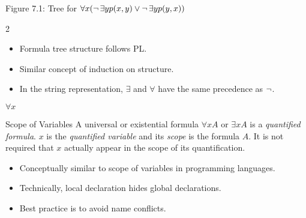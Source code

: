 \documentclass[style=sailor,size=12pt,mode=present]{powerdot}
\theoremstyle{definition}
\newenvironment{defn}[1]
  {\renewcommand\theinnerdefn{#1}\innerdefn}
  {\endinnerdefn}
\begin{document}
\begin{wideslide}[bm=,toc=]{Figure 7.1: Tree for
$\forall x(\mathop{\neg}\exists yp(x,y)\vee\mathop{\neg}\exists yp(y,x))$}
\begin{multicols}{2}
\begin{itemize}
\item Formula tree structure follows PL.
\item Similar concept of induction on structure.
\item In the string representation, $\exists$ and $\forall$ have the same precedence as $\mathop{\neg}$.
\end{itemize}
\begin{center}
\setlength{\GapWidth}{8mm}
\setlength{\GapDepth}{8mm}
\begin{bundle}{$\forall x$\rule[-1mm]{0mm}{1mm}}
\end{bundle}
\end{center}
\end{multicols}
\end{wideslide}

\begin{wideslide}[bm=,toc=]{Scope of Variables}
\begin{defn}{7.11}
A universal or existential formula $\forall x A$ or $\exists x A$
is a \emph{quantified formula}. $x$ is the \emph{quantified variable}
and its \emph{scope} is the formula $A$. It is not required that $x$
actually appear in the scope of its quantification.
\end{defn}
\begin{itemize}
\item Conceptually similar to scope of variables in programming languages.
\item Technically, local declaration hides global declarations.
\item Best practice is to avoid name conflicts.
\end{itemize}
\end{wideslide}
\end{document}
